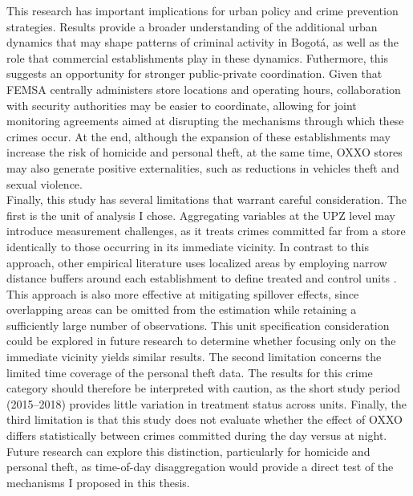 \documentclass[12pt]{article}
\begin{document}
This research has important implications for urban policy and crime prevention strategies. Results provide a broader understanding of the additional urban dynamics that may shape patterns of criminal activity in Bogotá, as well as the role that commercial establishments play in these dynamics. Futhermore, this suggests an opportunity for stronger public-private coordination. Given that FEMSA centrally administers store locations and operating hours, collaboration with security authorities may be easier to coordinate, allowing for joint monitoring agreements aimed at disrupting the mechanisms through which these crimes occur. At the end, although the expansion of these establishments may increase the risk of homicide and personal theft, at the same time, OXXO stores may also generate positive externalities, such as reductions in vehicles theft and sexual violence.\\

Finally, this study has several limitations that warrant careful consideration. The first is the unit of analysis I chose. Aggregating variables at the UPZ level may introduce measurement challenges, as it treats crimes committed far from a store identically to those occurring in its immediate vicinity. In contrast to this approach, other empirical literature uses localized areas by employing narrow distance buffers around each establishment to define treated and control units \parencite{jaramillo2021low, shin2024dollar}. This approach is also more effective at mitigating spillover effects, since overlapping areas can be omitted from the estimation while retaining a sufficiently large number of observations. This unit specification consideration could be explored in future research to determine whether focusing only on the immediate vicinity yields similar results. The second limitation concerns the limited time coverage of the personal theft data. The results for this crime category should therefore be interpreted with caution, as the short study period (2015–2018) provides little variation in treatment status across units. Finally, the third limitation is that this study does not evaluate whether the effect of OXXO differs statistically between crimes committed during the day versus at night. Future research can explore this distinction, particularly for homicide and personal theft, as time-of-day disaggregation would provide a direct test of the mechanisms I proposed in this thesis. 

\newpage
\printbibliography

\newpage
\end{document}
